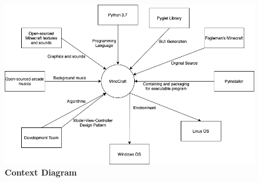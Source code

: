 \documentclass[12pt, titlepage]{article}
\begin{document}
\FloatBarrier
\begin{figure}[!bpht]
    \centering
        \includegraphics[scale=0.5]{Context.png}
    \caption{\bf{Context Diagram}}
\end{figure}
\FloatBarrier
\end{document}
